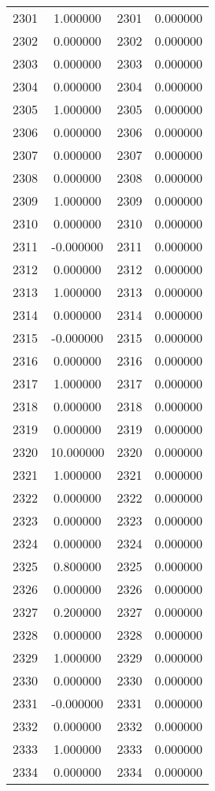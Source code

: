 \documentclass[12pt]{article}
\begin{document}
\begin{longtable}{@{}cccc@{}}
2301 & 1.000000 & 2301 & 0.000000 \\
2302 & 0.000000 & 2302 & 0.000000 \\
2303 & 0.000000 & 2303 & 0.000000 \\
2304 & 0.000000 & 2304 & 0.000000 \\
2305 & 1.000000 & 2305 & 0.000000 \\
2306 & 0.000000 & 2306 & 0.000000 \\
2307 & 0.000000 & 2307 & 0.000000 \\
2308 & 0.000000 & 2308 & 0.000000 \\
2309 & 1.000000 & 2309 & 0.000000 \\
2310 & 0.000000 & 2310 & 0.000000 \\
2311 & -0.000000 & 2311 & 0.000000 \\
2312 & 0.000000 & 2312 & 0.000000 \\
2313 & 1.000000 & 2313 & 0.000000 \\
2314 & 0.000000 & 2314 & 0.000000 \\
2315 & -0.000000 & 2315 & 0.000000 \\
2316 & 0.000000 & 2316 & 0.000000 \\
2317 & 1.000000 & 2317 & 0.000000 \\
2318 & 0.000000 & 2318 & 0.000000 \\
2319 & 0.000000 & 2319 & 0.000000 \\
2320 & 10.000000 & 2320 & 0.000000 \\
2321 & 1.000000 & 2321 & 0.000000 \\
2322 & 0.000000 & 2322 & 0.000000 \\
2323 & 0.000000 & 2323 & 0.000000 \\
2324 & 0.000000 & 2324 & 0.000000 \\
2325 & 0.800000 & 2325 & 0.000000 \\
2326 & 0.000000 & 2326 & 0.000000 \\
2327 & 0.200000 & 2327 & 0.000000 \\
2328 & 0.000000 & 2328 & 0.000000 \\
2329 & 1.000000 & 2329 & 0.000000 \\
2330 & 0.000000 & 2330 & 0.000000 \\
2331 & -0.000000 & 2331 & 0.000000 \\
2332 & 0.000000 & 2332 & 0.000000 \\
2333 & 1.000000 & 2333 & 0.000000 \\
2334 & 0.000000 & 2334 & 0.000000 \\

\end{longtable}
\end{document}
